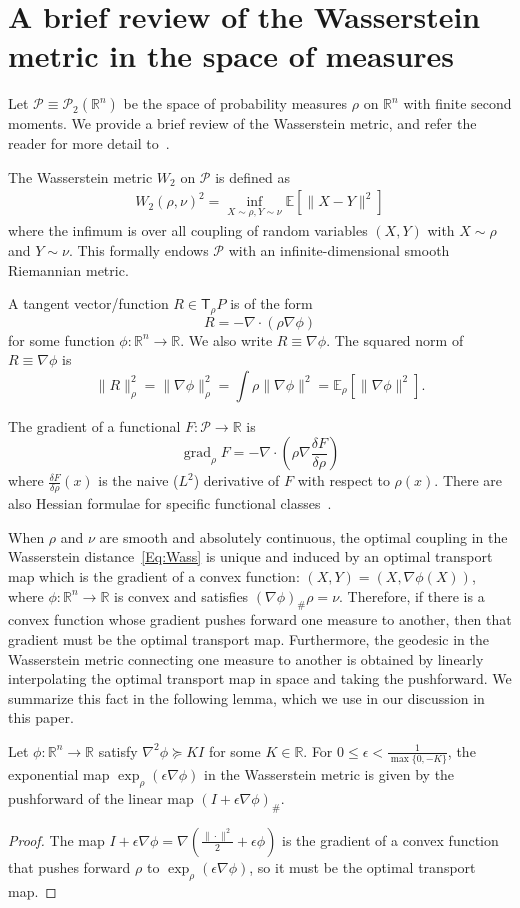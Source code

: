 \documentclass[final,12pt]{colt2018}
\newcommand{\R}{\mathbb{R}}
\newcommand{\E}{\mathbb{E}}
\DeclareMathOperator{\grad}{grad}
\newcommand{\T}{\mathsf{T}}
\renewcommand{\P}{\mathcal{P}}
\begin{document}
\section{A brief review of the Wasserstein metric in the space of measures}
\label{App:Wass}

Let $\P \equiv \P_2(\R^n)$ be the space of probability measures $\rho$ on $\R^n$ with finite second moments.
We provide a brief review of the Wasserstein metric, and refer the reader for more detail to~\cite{Vil03,Vil08,CG03,OV00}.

The Wasserstein metric $W_2$ on $\P$ is defined as
\begin{align}\label{Eq:Wass}
W_2(\rho,\nu)^2 = \inf_{X \sim \rho, Y \sim \nu} \E[\|X-Y\|^2]
\end{align}
where the infimum is over all coupling of random variables $(X,Y)$ with $X \sim \rho$ and $Y \sim \nu$.
This formally endows $\P$ with an infinite-dimensional smooth Riemannian metric.

A tangent vector/function $R \in \T_\rho P$ is of the form
$$R = -\nabla \cdot (\rho \nabla \phi)$$
for some function $\phi \colon \R^n \to \R$.
We also write $R \equiv \nabla \phi$.
The squared norm of $R \equiv \nabla \phi$ is
$$\|R\|^2_\rho = \|\nabla \phi\|^2_\rho = \int \rho \|\nabla \phi\|^2 = \E_\rho[\|\nabla \phi\|^2].$$

The gradient of a functional $F \colon \P \to \R$ is
$$\grad_\rho F = -\nabla \cdot \left( \rho \nabla \frac{\delta F}{\delta \rho} \right)$$
where $\frac{\delta F}{\delta \rho}(x)$ is the naive ($L^2$) derivative of $F$ with respect to $\rho(x)$.
There are also Hessian formulae for specific functional classes~\cite[$\S15$]{Vil08}.

When $\rho$ and $\nu$ are smooth and absolutely continuous, the optimal coupling in the Wasserstein distance~\eqref{Eq:Wass} is unique and induced by an optimal transport map which is the gradient of a convex function: $(X,Y) = (X, \nabla \phi(X))$, where $\phi \colon \R^n \to \R$ is convex and satisfies $(\nabla \phi)_\# \rho = \nu$.
Therefore, if there is a convex function whose gradient pushes forward one measure to another, then that gradient must be the optimal transport map.
Furthermore, the geodesic in the Wasserstein metric connecting one measure to another is obtained by linearly interpolating the optimal transport map in space and taking the pushforward. 
We summarize this fact in the following lemma, which we use in our discussion in this paper.

\begin{lemma}
Let $\phi \colon \R^n \to \R$ satisfy $\nabla^2 \phi \succeq KI$ for some $K \in \R$.
For $0 \le \epsilon < \frac{1}{\max\{0,-K\}}$,
the exponential map $\exp_\rho(\epsilon \nabla \phi)$ in the Wasserstein metric is given by the pushforward of the linear map $(I+\epsilon \nabla \phi)_\#$.
\end{lemma}
\begin{proof}
The map 
$I + \epsilon \nabla \phi = \nabla \left(\frac{\|\cdot\|^2}{2} + \epsilon \phi\right)$ is the gradient of a convex function that pushes forward $\rho$ to $\exp_\rho(\epsilon \nabla \phi)$, so it must be the optimal transport map.
\end{proof}
\end{document}

